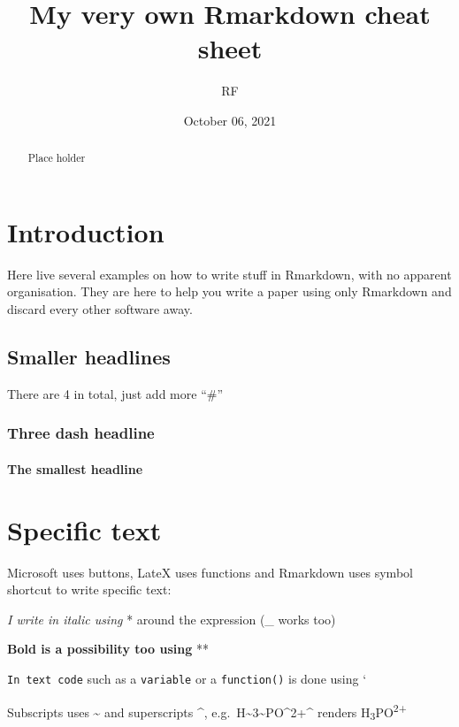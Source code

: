 \documentclass[
  11pt,
]{article}
\title{\textbf{My very own Rmarkdown cheat sheet}}
\author{RF}
\date{October 06, 2021}
\begin{document}
\maketitle
\begin{abstract}
Place holder
\end{abstract}

\hypertarget{introduction}{%
\section{Introduction}\label{introduction}}

Here live several examples on how to write stuff in Rmarkdown, with no apparent organisation. They are here to help you write a paper using only Rmarkdown and discard every other software away.

\hypertarget{smaller-headlines}{%
\subsection{Smaller headlines}\label{smaller-headlines}}

There are 4 in total, just add more ``\#''

\hypertarget{three-dash-headline}{%
\subsubsection{Three dash headline}\label{three-dash-headline}}

\hypertarget{the-smallest-headline}{%
\paragraph{The smallest headline}\label{the-smallest-headline}}

\hypertarget{specific-text}{%
\section{Specific text}\label{specific-text}}

Microsoft uses buttons, LateX uses functions and Rmarkdown uses symbol shortcut to write specific text:

\emph{I write in italic using} * around the expression (\_ works too)

\textbf{Bold is a possibility too using} **

\texttt{In\ text\ code} such as a \texttt{variable} or a \texttt{function()} is done using `

Subscripts uses \textasciitilde{} and superscripts \^{}, e.g.~H\textasciitilde3\textasciitilde PO\^{}2+\^{} renders H\textsubscript{3}PO\textsuperscript{2+}
\end{document}

